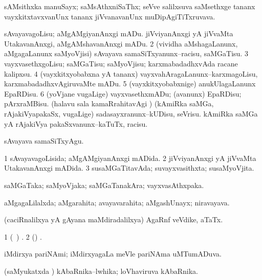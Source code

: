 \bentry
{}
\gl{\nA}
\bmng
sAMsithxka manuSayx; saMsAthxniSaThx; seVve salilxsuva saMsethxge tananx vayxkitxtavxvanUnx tananx jiVvanavanUnx muDipAgiTiTxruvava. 
\emng
\eentry

\bentry
{}
\gl{\sakirx}
\bmng
\bnum
{} 
\banum
{} sAvayavagoLisu; aMgAMgiyanAnxgi mADu. 
 jiVviyanAnxgi yA jiVvaMta UtakavanAnxgi, aMgAMshavanAnxgi mADu. 
\eanum
\numie
\num{2} (vividha aMshagaLanunx, aMgagaLanunx saMyoVjisi) sAvayava samaSiTxyanunx--racisu, saMGaTisu. 
\num{3} vayxvasethxgoLisu; saMGaTisu; saMyoVjisu; karxmabadadhxvAda racane kalipxsu. 
\num{4} (vayxkitxyobabxna yA tananx) vayxvahAragaLanunx--karxmagoLisu, karxmabadadhxvAgiruvaMte mADu. 
\num{5} (vayxkitxyobabxnige) anukUlagaLanunx EpaRDisu. 
\num{6} (yoVjane \mo vugaLige) vayxvasethxmADu; (avanunx) EpaRDisu; pArxraMBisu. 
 (halavu sala kamaRrahitavAgi \parx) 
\banum
{} (kAmiRka saMGa, rAjakiVyapakaSx, \mo vugaLige) sadasayxranunx--kUDisu, seVrisu. 
 kAmiRka saMGa yA rAjakiVya pakaSxvanunx--kaTuTx, racisu. 
\eanum
\numie
\enum
\emng

\noindent
\gl{\akirx}
\bmng
sAvayava samaSiTxyAgu. 
\emng
\eentry

\bentry
{}
\gl{\gu}
\bmng
\bnum
\num{1} sAvayavagoLisida; aMgAMgiyanAnxgi mADida. 
\num{2} jiVviyanAnxgi yA jiVvaMta UtakavanAnxgi mADida. 
\num{3} susaMGaTitavAda; suvayxvasithxta; susaMyoVjita. 
\enum
\emng
\eentry

\bentry
{}
\gl{\nA}
\bmng
saMGaTaka; saMyoVjaka; saMGaTanakAra; vayxvasAthxpaka. 
\emng
\eentry


\bentry
{}
\gl{\gu}
\bmng
aMgagaLilalxda; aMgarahita; avayavarahita; aMgashUnayx; niravayava. 
\emng
\eentry

\bentry
{}
\gl{\nA}
\bmng
(caciRnalilxya yA gAyana maMdiradalilxya) AgaRnf veVdike, aTaTx. 
\emng
\eentry

\bentry
{}
\gl{\sapUpa}
\bmng
\bnum
\num{1} (\kanmu\ \jiVvi) . 
\num{2} (\ravi) . 
\enum
\emng
\eentry

\bentry
{}
\gl{\gu}
\bmng
iMdirxya pariNAmi; iMdirxyagaLa meVle pariNAma uMTumADuva. 
\emng
\eentry

\bentry
{}
\gl{\gu}
\bmng
(saMyukatxda \vi) kAbaRnika--lwhika; loVhaviruva kAbaRnika. 
\emng
\eentry

